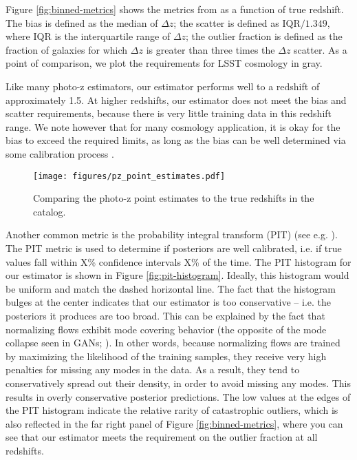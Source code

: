 \documentclass[twocolumn]{aastex631}
\begin{document}
Figure \ref{fig:binned-metrics} shows the metrics from \citet{descSRD} as a function of true redshift.
The bias is defined as the median of $\Delta z$; the scatter is defined as $\text{IQR} / 1.349$, where IQR is the interquartile range of $\Delta z$; the outlier fraction is defined as the fraction of galaxies for which $\Delta z$ is greater than three times the $\Delta z$ scatter.
As a point of comparison, we plot the requirements for LSST cosmology in gray.

Like many photo-z estimators, our estimator performs well to a redshift of approximately 1.5.
At higher redshifts, our estimator does not meet the bias and scatter requirements, because there is very little training data in this redshift range.
We note however that for many cosmology application, it is okay for the bias to exceed the required limits, as long as the bias can be well determined via some calibration process \citep{newman2022}.

\begin{figure}[t!]
    \begin{centering}
        \texttt{[image: figures/pz\_point\_estimates.pdf]}
        \caption{
            Comparing the photo-z point estimates to the true redshifts in the catalog.
        }
        \label{fig:point-estimates}
    \end{centering}
\end{figure}

Another common metric is the probability integral transform (PIT) (see e.g. \citealt{schmidt2020, dey2022}).
The PIT metric is used to determine if posteriors are well calibrated, i.e. if true values fall within X\% confidence intervals X\% of the time.
The PIT histogram for our estimator is shown in Figure \ref{fig:pit-histogram}.
Ideally, this histogram would be uniform and match the dashed horizontal line.
The fact that the histogram bulges at the center indicates that our estimator is too conservative -- i.e. the posteriors it produces are too broad.
This can be explained by the fact that normalizing flows exhibit mode covering behavior (the opposite of the mode collapse seen in GANs; \citealt{salimans2016}).
In other words, because normalizing flows are trained by maximizing the likelihood of the training samples, they receive very high penalties for missing any modes in the data.
As a result, they tend to conservatively spread out their density, in order to avoid missing any modes.
This results in overly conservative posterior predictions.
The low values at the edges of the PIT histogram indicate the relative rarity of catastrophic outliers, which is also reflected in the far right panel of Figure \ref{fig:binned-metrics}, where you can see that our estimator meets the requirement on the outlier fraction at all redshifts.
\end{document}
